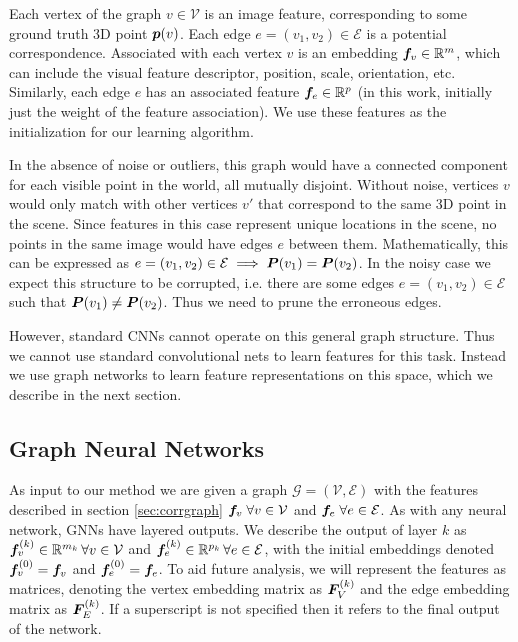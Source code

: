 \documentclass{article} %
\begin{document}
Each vertex of the graph $v \in \mathcal{V}$ is an image feature, corresponding to some ground truth 3D point ${\bm{p}}(v)$.
Each edge $e = (v_1, v_2) \in \mathcal{E}$ is a potential correspondence.
Associated with each vertex $v$ is an embedding ${\bm{f}}_v \in {\mathbb{R}}^m$, which can include the visual feature descriptor, position, scale, orientation, etc.
Similarly, each edge $e$ has an associated feature ${\bm{f}}_e \in {\mathbb{R}}^p$ (in this work, initially just the weight of the feature association).
We use these features as the initialization for our learning algorithm.

In the absence of noise or outliers, this graph would have a connected component for each visible point in the world, all mutually disjoint.
Without noise, vertices $v$ would only match with other vertices $v'$ that correspond to the same 3D point in the scene.
Since features in this case represent unique locations in the scene, no points in the same image would have edges $e$ between them.
Mathematically, this can be expressed as $e = (v_1, v_2) \in \mathcal{E} \implies {\bm{P}}(v_1) = {\bm{P}}(v_2)$.
In the noisy case we expect this structure to be corrupted, i.e. there are some edges $e = (v_1, v_2) \in \mathcal{E}$ such that ${\bm{P}}(v_1) \neq {\bm{P}}(v_2)$.
Thus we need to prune the erroneous edges.

However, standard CNNs cannot operate on this general graph structure.
Thus we cannot use standard convolutional nets to learn features for this task.
Instead we use graph networks to learn feature representations on this space, which we describe in the next section.

\subsection{Graph Neural Networks} \label{sec:gnns}
As input to our method we are given a graph $\mathcal{G} = (\mathcal{V}, \mathcal{E})$ with the features described in section \ref{sec:corrgraph} ${\bm{f}}_v \; \forall v \in \mathcal{V}$ and ${\bm{f}}_e \; \forall e \in \mathcal{E}$.
As with any neural network, GNNs have layered outputs.
We describe the output of layer $k$ as ${\bm{f}}_v^{(k)} \in {\mathbb{R}}^{m_k} \, \forall v \in \mathcal{V}$ and ${\bm{f}}_e^{(k)} \in {\mathbb{R}}^{p_k}\, \forall e \in \mathcal{E}$, with the initial embeddings denoted ${\bm{f}}_v^{(0)} = {\bm{f}}_v$ and ${\bm{f}}_e^{(0)} = {\bm{f}}_e$.
To aid future analysis, we will represent the features as matrices, denoting the vertex embedding matrix as ${\bm{F}}_V^{(k)}$ and the edge embedding matrix as ${\bm{F}}_E^{(k)}$.
If a superscript is not specified then it refers to the final output of the network.
\end{document}
